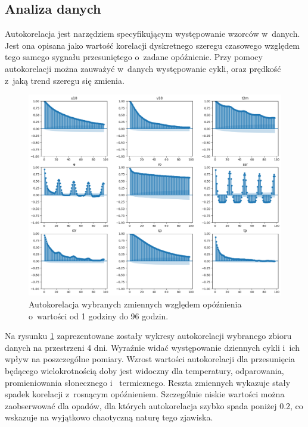 \subsection{Analiza danych}

Autokorelacja jest narzędziem specyfikującym występowanie wzorców w~danych. Jest ona 
opisana jako wartość korelacji dyskretnego szeregu czasowego względem tego samego sygnału
przesuniętego o~zadane opóźnienie. Przy pomocy autokorelacji można zauważyć w~danych
występowanie cykli, oraz prędkość z~jaką trend szeregu się zmienia.

\begin{figure}[H]
    \centering
    \includegraphics[width=\textwidth]{images/autocorrelation.png}
    \caption[Autokorelacja danych]{Autokorelacja wybranych zmiennych względem opóźnienia o~wartości od 
    1 godziny do 96 godzin.}
    \label{autocorrelation}
\end{figure}

Na rysunku \ref{autocorrelation} zaprezentowane zostały wykresy autokorelacji wybranego
zbioru danych na przestrzeni 4 dni. Wyraźnie widać występowanie dziennych cykli i~ich wpływ
na poszczególne pomiary. Wzrost wartości autokorelacji dla przesunięcia będącego
wielokrotnością doby jest widoczny dla temperatury, odparowania, promieniowania słonecznego i~
termicznego. Reszta zmiennych wykazuje stały spadek korelacji z~rosnącym opóźnieniem. 
Szczególnie niskie wartości można zaobserwować dla opadów, dla których autokorelacja szybko spada
poniżej 0.2, co wskazuje na wyjątkowo chaotyczną naturę tego zjawiska.

